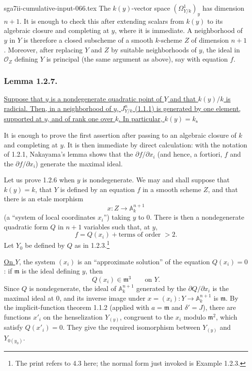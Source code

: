 \begin{filecontents*}{sga7ii-cumulative-input-066.tex}
The $k(y)$-vector space $(\Omega^1_{Y/k})_y$ has dimension $n+1$.
It is enough to check this after extending scalars from $k(y)$ to its
algebraic closure and completing at $y$, where it is immediate.  A
neighborhood of $y$ in $Y$ is therefore a closed subscheme of a
smooth $k$-scheme $Z$ of dimension $n+1$.  Moreover, after replacing
$Y$ and $Z$ by suitable neighborhoods of $y$, the ideal in
$\mathcal O_Z$ defining $Y$ is principal (the same argument as
above), say with equation $f$.

\subsubsection*{Lemma 1.2.7.}
\underline{Suppose that $y$ is a nondegenerate quadratic point of
$Y$ and that $k(y)/k$ is radicial.  Then, in a neighborhood of $y$,
$J^n_{Y/k}$ (1.1.1) is generated by one element, supported at $y$,
and of rank one over $k$.  In particular, $k(y)=k$.}

It is enough to prove the first assertion after passing to an
algebraic closure of $k$ and completing at $y$.  It is then immediate
by direct calculation: with the notation of 1.2.1, Nakayama's lemma
shows that the $\partial f/\partial x_i$ (and hence, a fortiori, $f$
and the $\partial f/\partial x_i$) generate the maximal ideal.

Let us prove 1.2.6 when $y$ is nondegenerate.  We may and shall
suppose that $k(y)=k$, that $Y$ is defined by an equation $f$ in a
smooth scheme $Z$, and that there is an etale morphism
\[
x:Z\longrightarrow\mathbb A_k^{n+1}
\]
(a ``system of local coordinates $x_i$'') taking $y$ to $0$.  There
is then a nondegenerate quadratic form $Q$ in $n+1$ variables such
that, at $y$,
\[
f=Q(x_i)+\text{terms of order }>2.
\]
Let $Y_0$ be defined by $Q$ as in 1.2.3.\footnote{The print refers to
4.3 here; the normal form just invoked is Example 1.2.3.}

\underline{On $Y$}, the system $(x_i)$ is an ``approximate solution''
of the equation $Q(x_i)=0$: if $\mathfrak m$ is the ideal defining
$y$, then
\[
Q(x_i)\in\mathfrak m^3\qquad\text{on }Y.
\]
Since $Q$ is nondegenerate, the ideal of $\mathbb A_k^{n+1}$
generated by the $\partial Q/\partial x_i$ is the maximal ideal at
$0$, and its inverse image under
$x=(x_i):Y\to\mathbb A_k^{n+1}$ is $\mathfrak m$.  By the
implicit-function theorem 1.1.2 (applied with $a=\mathfrak m$ and
$\delta'=J$), there are functions $x'_i$ on the henselization
$Y_{(y)}$, congruent to the $x_i$ modulo $\mathfrak m^2$, which
satisfy $Q(x'_i)=0$.  They give the required isomorphism between
$Y_{(y)}$ and $Y_{0(y_0)}$.


\end{filecontents*}
